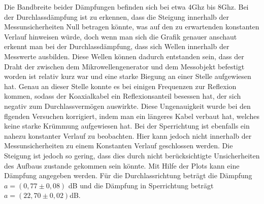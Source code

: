 Die Bandbreite beider Dämpfungen befinden sich bei etwa 4Ghz bis 8Ghz. Bei der Durchlassdämpfung ist zu erkennen, dass die Steigung innerhalb der Messunsicherheiten Null betragen könnte, was auf den zu erwartenden konstanten Verlauf hinweisen würde, doch wenn man sich die Grafik genauer anschaut erkennt man bei der Durchlassdämpfung, dass sich Wellen innerhalb der Messwerte ausbilden. Diese Wellen können dadurch entstanden sein, dass der Draht der zwischen dem Mikrowellengenerator und dem Messobjekt befestigt worden ist relativ kurz war und eine starke Biegung an einer Stelle aufgewiesen hat. Genau an dieser Stelle konnte es bei einigen Frequenzen zur Reflexion kommen, sodass der Koaxialkabel ein Reflexionsanteil besessen hat, der sich negativ zum Durchlassvermögen auswirkte. Diese Ungenauigkeit wurde bei den flgenden Versuchen korrigiert, indem man ein längeres Kabel verbaut hat, welches keine starke Krümmung aufgewiesen hat. Bei der Sperrichtung ist ebenfalls ein nahezu konstanter Verlauf zu beobachten. Hier kann jedoch nicht innerhalb der Messunsicherheiten zu einem Konstanten Verlauf geschlossen werden. Die Steigung ist jedoch so gering, dass dies durch nicht berücksichtigte Unsicherheiten des Aufbaus zustande gekommen sein könnte. Mit Hilfe der Plots kann eine Dämpfung angegeben werden. Für die Durchlassrichtung beträgt die Dämpfung $a = (0,77 \pm 0,08)$ dB und die Dämpfung in Sperrichtung beträgt
$a = (22,70 \pm 0,02)$dB.

